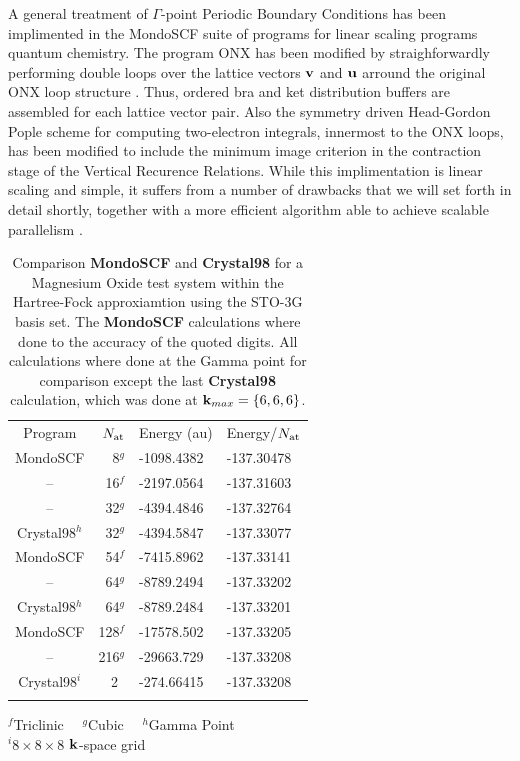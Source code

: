 \documentclass[prb,aps,nobibnotes,twocolumn,doublespace,twocolumngrid,superbib]{revtex4}
\begin{document}
A general treatment of $\Gamma$-point Periodic Boundary Conditions has been implimented in the MondoSCF
suite of programs for linear scaling programs quantum chemistry.  The program {\sc ONX} \cite{} has been 
modified by straighforwardly performing double loops over the lattice vectors $\bf v$ and $\bf u$
arround the original ONX loop structure \cite{}.  Thus, ordered bra and ket distribution buffers are 
assembled for each lattice vector pair.   Also the symmetry driven Head-Gordon Pople scheme for 
computing two-electron integrals, innermost to the ONX loops, has been modified to include the 
minimum image criterion in the contraction stage of the Vertical Recurence Relations.  While this implimentation
is linear scaling and simple, it suffers from a number of drawbacks that we will set forth in detail shortly, 
together with a more efficient algorithm able to achieve scalable parallelism \cite{}.

\pagebreak

\begin{table}
\caption{Comparison \textbf{MondoSCF} and \textbf{Crystal98} for a 
Magnesium Oxide test system within the Hartree-Fock approxiamtion using
the STO-3G basis set. The \textbf{MondoSCF} calculations where done to
the accuracy of the quoted digits. All calculations where done at the Gamma point
for comparison except the last \textbf{Crystal98} calculation, which was done at 
${\bf k}_{max}=\{6,6,6\}$.}
\label{table:ComToCrystal98}
\begin{tabular}{crll}
\toprule
Program         & $N_{\rm at}$              & Energy (au)   & Energy/$N_{\rm at}$\\ 
\colrule
{\sc MondoSCF}       & 8$^g$    & -1098.4382  & -137.30478 \\
     --              & 16$^f$   & -2197.0564  & -137.31603 \\
     --              & 32$^g$   & -4394.4846  & -137.32764 \\
{\sc Crystal98}$^h$  & 32$^g$   & -4394.5847  & -137.33077 \\
{\sc MondoSCF}       & 54$^f$   & -7415.8962  & -137.33141  \\
     --              & 64$^g$   & -8789.2494  & -137.33202  \\
{\sc Crystal98}$^h$  & 64$^g$   & -8789.2484  & -137.33201 \\
{\sc MondoSCF}       & 128$^f$  & -17578.502  & -137.33205 \\
     --              & 216$^g$  & -29663.729  & -137.33208 \\ 
\hline
{\sc Crystal98}$^i$  & 2\       & -274.66415  & -137.33208  \\ 
\botrule 
\end{tabular}

$^f$Triclinic~~
$^g$Cubic~~
$^h$Gamma Point \\
$^i 8\times8\times8$ $\bf k$-space grid  \\
\end{table}
\end{document}

